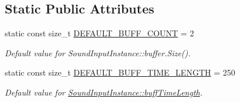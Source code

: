 \subsection*{Static Public Attributes}
\begin{DoxyCompactItemize}
\item 
\hypertarget{class_sound_input_instance_a8d86896f21f4f23512c90911972c57ef}{
static const size\_\-t \hyperlink{class_sound_input_instance_a8d86896f21f4f23512c90911972c57ef}{DEFAULT\_\-BUFF\_\-COUNT} = 2}
\label{class_sound_input_instance_a8d86896f21f4f23512c90911972c57ef}

\begin{DoxyCompactList}\small\item\em Default value for SoundInputInstance::buffer.Size(). \item\end{DoxyCompactList}\item 
\hypertarget{class_sound_input_instance_ad9349980f3cc6f62bfed052ca75bb11b}{
static const size\_\-t \hyperlink{class_sound_input_instance_ad9349980f3cc6f62bfed052ca75bb11b}{DEFAULT\_\-BUFF\_\-TIME\_\-LENGTH} = 250}
\label{class_sound_input_instance_ad9349980f3cc6f62bfed052ca75bb11b}

\begin{DoxyCompactList}\small\item\em Default value for \hyperlink{class_sound_input_instance_a3c7af70300e1f3da9b51ff0cf7222bb4}{SoundInputInstance::buffTimeLength}. \item\end{DoxyCompactList}\end{DoxyCompactItemize}
